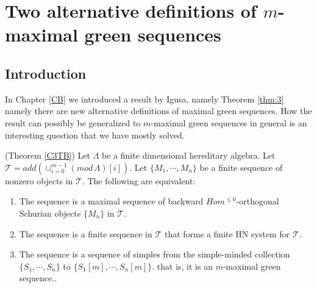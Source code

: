 \chapter{Two alternative definitions of $m$-maximal green sequences}\label{C3}
\section{Introduction}
\indent In Chapter \ref{CB} we introduced a result by Igusa, namely Theorem \ref{thm:3} namely there are new alternative definitions of maximal green sequences. How the result can possibly be generalized to $m$-maximal green sequences in general is an interesting question that we have mostly solved.\\
\begin{theorem}\label{C3T}
\indent (Theorem \ref{C3TB}) Let $\Lambda$ be a finite dimensional hereditary algebra. Let $\mathcal{T} = add(\cup_{i=0}^{m-1} (mod\,\Lambda)[i])$. Let $\{M_1,\cdots, M_n\}$ be a finite sequence of nonzero objects in $\mathcal{T}$. The following are equivalent:
\begin{enumerate}
\item The sequence is a maximal sequence of backward $Hom^{\leq 0}$-orthogonal Schurian objects $\{M_n\}$ in $\mathcal{T}$.
\item The sequence is a finite sequence in $\mathcal{T}$ that forms a finite HN system for $\mathcal{T}$.
\item The sequence is a sequence of simples from the simple-minded collection $\{S_1,\cdots, S_n\}$ to  $\{S_1[m],\cdots, S_n[m]\}$. that is, it is an $m$-maximal green sequence..
\end{enumerate}
\end{theorem}

